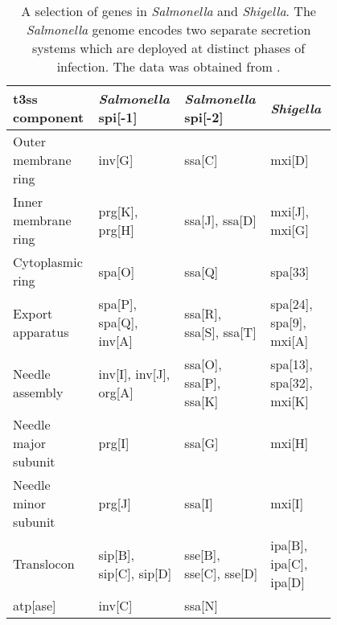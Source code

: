 \begin{table}
  \centering
  \caption[Homologous genes of  in \textit{Salmonella} and \textit{Shigella}.]{A selection of  genes in \textit{Salmonella} and \textit{Shigella}. The \textit{Salmonella} genome encodes two separate secretion systems which are deployed at distinct phases of infection. The data was obtained from \citet{Wang2012}.}
  \label{tab:t3ss-genes}
  \footnotesize
  \begin{tabular}{L{0.2\linewidth}L{0.2\linewidth}L{0.2\linewidth}L{0.2\linewidth}}
    \acrshort{t3ss} component&
      \textit{Salmonella} \acrshort{spi}[-1] &
      \textit{Salmonella} \acrshort{spi}[-2] &
      \textit{Shigella} \\
    \hline 
    Outer membrane ring &
      \acrshort{inv}[G] &
      \acrshort{ssa}[C] &
      \acrshort{mxi}[D] \\
    Inner membrane ring &
      \acrshort{prg}[K], \acrshort{prg}[H] &
      \acrshort{ssa}[J], \acrshort{ssa}[D] &
      \acrshort{mxi}[J], \acrshort{mxi}[G] \\
    Cytoplasmic ring &
      \acrshort{spa}[O] &
      \acrshort{ssa}[Q] &
      \acrshort{spa}[33] \\
    Export apparatus &
      \acrshort{spa}[P], \acrshort{spa}[Q], \acrshort{inv}[A] &
      \acrshort{ssa}[R], \acrshort{ssa}[S], \acrshort{ssa}[T] &
      \acrshort{spa}[24], \acrshort{spa}[9], \acrshort{mxi}[A] \\
    Needle assembly &
      \acrshort{inv}[I], \acrshort{inv}[J], \acrshort{org}[A] &
      \acrshort{ssa}[O], \acrshort{ssa}[P], \acrshort{ssa}[K] &
      \acrshort{spa}[13], \acrshort{spa}[32], \acrshort{mxi}[K] \\
    Needle major subunit &
      \acrshort{prg}[I] &
      \acrshort{ssa}[G] &
      \acrshort{mxi}[H] \\
    Needle minor subunit &
      \acrshort{prg}[J] &
      \acrshort{ssa}[I] &
      \acrshort{mxi}[I] \\
    Translocon &
      \acrshort{sip}[B], \acrshort{sip}[C], \acrshort{sip}[D] &
      \acrshort{sse}[B], \acrshort{sse}[C], \acrshort{sse}[D] &
      \acrshort{ipa}[B], \acrshort{ipa}[C], \acrshort{ipa}[D] \\
    \acrshort{atp}[ase] &
      \acrshort{inv}[C] &
      \acrshort{ssa}[N] &

\end{tabular}
\end{table}
